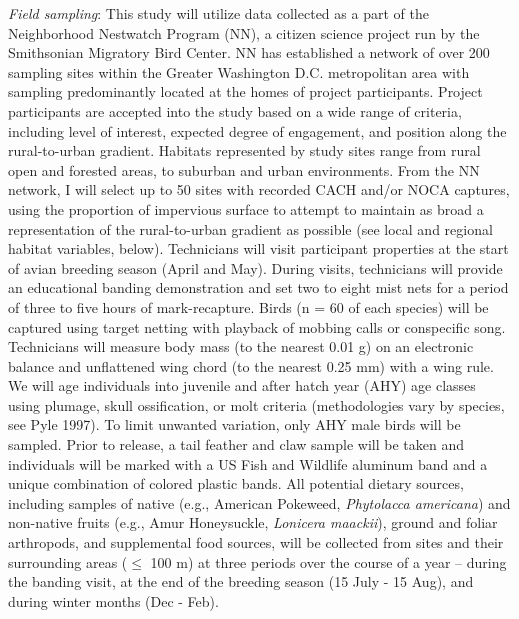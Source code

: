 \documentclass[12pt]{article}
\begin{document}
\noindent \textit {Field sampling}: This study will utilize data collected as a part of the Neighborhood Nestwatch Program (NN), a citizen science project run by the Smithsonian Migratory Bird Center. NN has established a network of over 200 sampling sites within the Greater Washington D.C. metropolitan area with sampling predominantly located at the homes of project participants. Project participants are accepted into the study based on a wide range of criteria, including level of interest, expected degree of engagement, and position along the rural-to-urban gradient. Habitats represented by study sites range from rural open and forested areas, to suburban and urban environments. From the NN network, I will select up to 50 sites with recorded CACH and/or NOCA captures, using the proportion of impervious surface to attempt to maintain as broad a representation of the rural-to-urban gradient as possible (see local and regional habitat variables, below). Technicians will visit participant properties at the start of avian breeding season (April and May). During visits, technicians will provide an educational banding demonstration and set two to eight mist nets for a period of three to five hours of mark-recapture. Birds (n = 60 of each species) will be captured using target netting with playback of mobbing calls or conspecific song. Technicians will measure body mass (to the nearest 0.01 g) on an electronic balance and unflattened wing chord (to the nearest 0.25 mm) with a wing rule. We will age individuals into juvenile and after hatch year (AHY) age classes using plumage, skull ossification, or molt criteria (methodologies vary by species, see Pyle 1997). To limit unwanted variation, only AHY male birds will be sampled. Prior to release, a  tail feather and claw sample will be taken and individuals will be marked with a US Fish and Wildlife aluminum band and a unique combination of colored plastic bands. All potential dietary sources, including samples of native  (e.g., American  Pokeweed, \textit {Phytolacca americana}) and non-native fruits (e.g., Amur Honeysuckle, \textit {Lonicera maackii}), ground and foliar arthropods, and supplemental food sources, will be collected from sites and their surrounding areas ($\leq$ 100 m) at three periods over the course of a year -- during the banding visit, at the end of the breeding season (15 July - 15 Aug), and during winter months (Dec - Feb).\par
\end{document}
